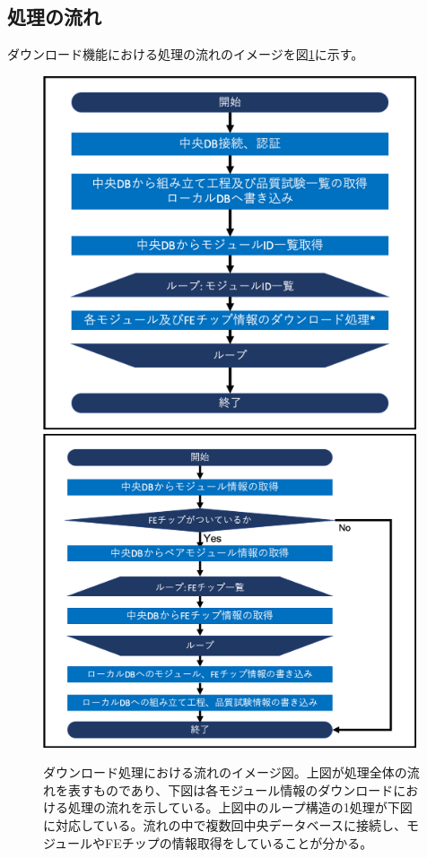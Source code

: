 \subsection{処理の流れ}

ダウンロード機能における処理の流れのイメージを図\ref{download_algorithm}に示す。

\begin{figure}[bpt]\centering
  \begin{center}
  \includegraphics[width=11cm]{./download_tool_flow_whole.png}
  \includegraphics[width=11cm]{./download_tool_flow_detail.png}
  \caption[ダウンロード処理における流れのイメージ図]{ダウンロード処理における流れのイメージ図。上図が処理全体の流れを表すものであり、下図は各モジュール情報のダウンロードにおける処理の流れを示している。上図中のループ構造の1処理が下図に対応している。流れの中で複数回中央データベースに接続し、モジュールやFEチップの情報取得をしていることが分かる。}
  \label{download_algorithm}
  \end{center}
\end{figure}

